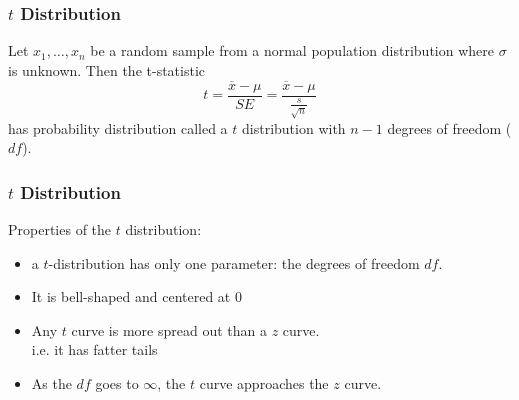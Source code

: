 \documentclass[handout]{beamer}
\newcommand{\blue}[1]{\textcolor{blue2}{#1}}
\begin{document}
\begin{frame}
\frametitle{$t$ Distribution}
%
%
Let $x_1,\ldots,x_n$ be a random sample from a \blue{normal} population distribution where $\sigma$ is unknown.  \pause Then the \blue{t-statistic}
\[
t = \frac{\overline{x}-\mu}{SE} = \frac{\overline{x}-\mu}{\frac{s}{\sqrt n}}
\]
has probability distribution called a \blue{$t$ distribution with $n-1$ degrees of freedom ($df$)}.

\end{frame}


\begin{frame}
\frametitle{$t$ Distribution}
Properties of the $t$ distribution:

\begin{itemize}
\item a $t$-distribution has only one parameter: the \blue{degrees of freedom} $df$.
\pause \item It is bell-shaped and centered at 0
\pause \item Any $t$ curve is more spread out than a $z$ curve.\\
i.e. it has \blue{fatter tails}
\pause \item As the $df$ goes to $\infty$, the $t$ curve approaches the $z$ curve.
\end{itemize}

\end{frame}
\end{document}
